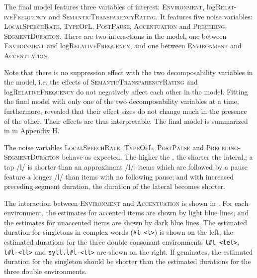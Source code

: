 The final model features three variables of interest: \textsc{Environment}, log\textsc{Relat-iveFrequency} and \textsc{SemanticTransparencyRating}. It features five noise variables: \textsc{LocalSpeechRate}, \textsc{TypeOfL}, \textsc{PostPause}, \textsc{Accentuation} and \textsc{Preceding-SegmentDuration}. 
There are two interactions in the model, one between \textsc{Environment} and log\textsc{RelativeFrequency}, and one between \textsc{Environment} and \textsc{Accentuation}. 

Note that there is no suppression effect with the two decomposability variables in the model, i.e. the effects of  \textsc{SemanticTransparencyRating} and log\textsc{Rela\-tive\-Frequency} do not negatively affect each other in the model. Fitting the final model with only one of the two decomposability variables at a time, furthermore, revealed that their effect sizes do not change much in the presence of the other. Their effects are thus interpretable.
The final model is summarized in  in \hyperref[Appendix H: Model Summaries Experiment]{Appendix H}.

The noise variables \textsc{LocalSpeechRate}, \textsc{TypeOfL}, \textsc{PostPause} and \textsc{Preceding- SegmentDuration} behave as expected. The higher the , the shorter the lateral.; a tap /l/ is shorter than an approximant /l/; items which are followed by a pause feature a longer /l/ than items with no following pause; and with increased preceding segment duration, the duration of the lateral becomes shorter.



The interaction between \textsc{Environment} and \textsc{Accentuation} is shown in . 
For each environment, the estimates for accented items are shown by light blue lines, and the estimates for unaccented items are shown by dark blue lines. The estimated duration for singletons in complex words (\texttt{\#l-<l>}) is shown on the left, the estimated durations for the three double consonant environments \texttt{l\#l-<lel>}, \texttt{l\#l-<ll>} and \texttt{syll.l\#l-<ll>} are shown on the right. If  geminates, the estimated duration for the singleton should be shorter than the estimated durations for the three double environments. 


